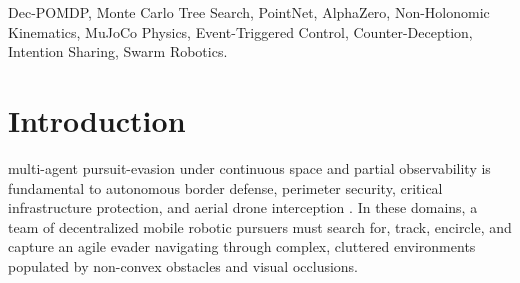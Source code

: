 \documentclass[conference]{IEEEtran}
\begin{document}
\begin{IEEEkeywords}
Dec-POMDP, Monte Carlo Tree Search, PointNet, AlphaZero, Non-Holonomic Kinematics, MuJoCo Physics, Event-Triggered Control, Counter-Deception, Intention Sharing, Swarm Robotics.
\end{IEEEkeywords}

\section{Introduction}
 multi-agent pursuit-evasion under continuous space and partial observability is fundamental to autonomous border defense, perimeter security, critical infrastructure protection, and aerial drone interception \cite{guibas1999visibility, isler2005randomized, pierson2017intercepting}. In these domains, a team of decentralized mobile robotic pursuers must search for, track, encircle, and capture an agile evader navigating through complex, cluttered environments populated by non-convex obstacles and visual occlusions.
\end{document}
